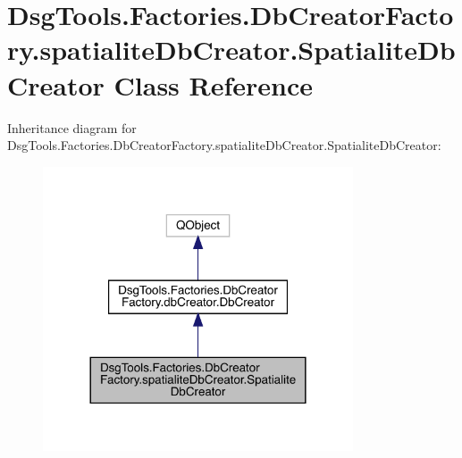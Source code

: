 \hypertarget{class_dsg_tools_1_1_factories_1_1_db_creator_factory_1_1spatialite_db_creator_1_1_spatialite_db_creator}{}\section{Dsg\+Tools.\+Factories.\+Db\+Creator\+Factory.\+spatialite\+Db\+Creator.\+Spatialite\+Db\+Creator Class Reference}
\label{class_dsg_tools_1_1_factories_1_1_db_creator_factory_1_1spatialite_db_creator_1_1_spatialite_db_creator}


Inheritance diagram for Dsg\+Tools.\+Factories.\+Db\+Creator\+Factory.\+spatialite\+Db\+Creator.\+Spatialite\+Db\+Creator\+:
\nopagebreak
\begin{figure}[H]
\begin{center}
\leavevmode
\includegraphics[width=260pt]{class_dsg_tools_1_1_factories_1_1_db_creator_factory_1_1spatialite_db_creator_1_1_spatialite_db_creator__inherit__graph}
\end{center}
\end{figure}


